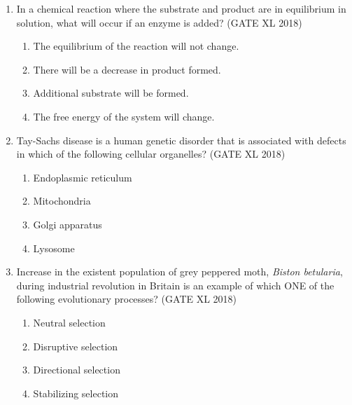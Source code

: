 \documentclass[14pt]{extarticle}
\begin{document}
\begin{flushleft}
\begin{enumerate}
    \item In a chemical reaction where the substrate and product are in equilibrium in solution, what will occur if an enzyme is added? \hfill(GATE XL 2018)\\
    \begin{enumerate}[label=(\Alph*)]
        \item The equilibrium of the reaction will not change.
        \item There will be a decrease in product formed.
        \item Additional substrate will be formed.
        \item The free energy of the system will change.
    \end{enumerate}

    \item Tay-Sachs disease is a human genetic disorder that is associated with defects in which  of the following cellular organelles? 
    \hfill(GATE XL 2018)\\
    \begin{multicols}{2}
    \begin{enumerate}[label=(\Alph*)]
        \item Endoplasmic reticulum
        \item Mitochondria
        \item Golgi apparatus
        \item Lysosome
    \end{enumerate}
    \end{multicols}

    \item Increase in the existent population of grey peppered moth, \textit{Biston betularia}, during industrial revolution in Britain is an example of which ONE of the following evolutionary processes? \hfill(GATE XL 2018)\\
    \begin{multicols}{2}
    \begin{enumerate}[label=(\Alph*)]
        \item Neutral selection
        \item Disruptive selection
        \item Directional selection
        \item Stabilizing selection
    \end{enumerate}
    \end{multicols}
    


\end{enumerate}
\end{flushleft}
\end{document}
